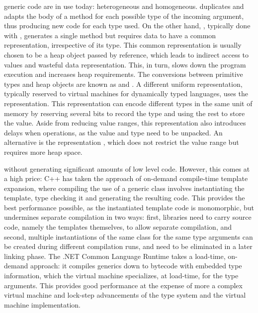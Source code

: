  generic code are in use today: heterogeneous and homogeneous.  duplicates and adapts the body of a method for each possible type of the incoming argument, thus producing new code for each type used. On the other hand, , typically done with , generates a single method but requires data to have a common representation, irrespective of its type. This common representation is usually chosen to be a heap object passed by reference, which leads to indirect access to values and wasteful data representation. This, in turn, slows down the program execution and increases heap requirements. The conversions between primitive types and heap objects are known as  and . A different uniform representation, typically reserved to virtual machines for dynamically typed languages, uses the  \cite{fixnums-lisp} representation. This representation can encode different types in the same unit of memory by reserving several bits to record the type and using the rest to store the value. Aside from reducing value ranges, this representation also introduces delays when  operations, as the value and type need to be unpacked. An alternative is the  representation \cite{tagged-unions-lua}, which does not restrict the value range but requires more heap space.

 without generating significant amounts of low level code. However, this comes at a high price: C++ has taken the approach of on-demand compile-time template expansion, where compiling the use of a generic class involves instantiating the template, type checking it and generating the resulting code. This provides the best performance possible, as the instantiated template code is monomorphic, but undermines separate compilation in two ways: first, libraries need to carry source code, namely the templates themselves, to allow separate compilation, and second, multiple instantiations of the same class for the same type arguments can be created during different compilation runs, and need to be eliminated in a later linking phase. The .NET Common Language Runtime takes a load-time, on-demand approach: it compiles generics down to bytecode with embedded type information, which the virtual machine specializes, at load-time, for the type arguments. This provides good performance at the expense of more a complex virtual machine and lock-step advancements of the type system and the virtual machine implementation.

